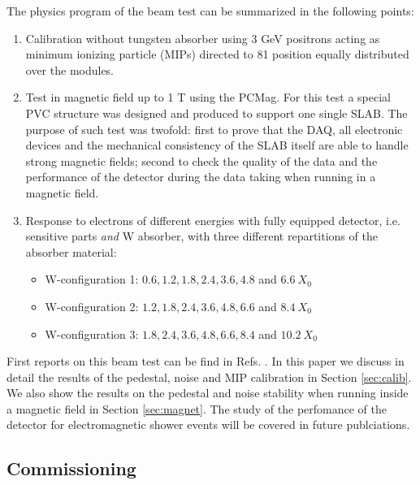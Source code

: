 \documentclass[final,3p,times,twocolumn]{elsarticle}
\begin{document}
The physics program of the beam test can be summarized in the following points:

\begin{enumerate}
\item Calibration without tungsten absorber using 3 GeV positrons acting as minimum ionizing particle (MIPs) directed to 81 position equally distributed over the modules.
\item Test in magnetic field up to 1 T using the PCMag. For this test a special PVC structure was
designed and produced to support one single SLAB.	
The purpose of such test was twofold: first to prove that the DAQ, all electronic devices and the 
mechanical consistency of the SLAB itself are able
to handle strong magnetic fields; 
second to check the quality of the data and the performance of the detector during the data taking when running
in a magnetic field.
\item Response to electrons of different energies with fully equipped detector, i.e. sensitive parts {\it and} W absorber, with three different repartitions of the absorber material:
\begin{itemize}
\item W-configuration 1: $0.6,1.2,1.8,2.4,3.6,4.8$ and $6.6~X_{0}$
\item W-configuration 2: $1.2,1.8,2.4,3.6,4.8,6.6$ and $8.4~X_{0}$
\item W-configuration 3: $1.8,2.4,3.6,4.8,6.6,8.4$ and $10.2~X_{0}$
\end{itemize}
\end{enumerate}

First reports on this beam test can be find in
Refs. \cite{Irles:2018uum,Irles:2018hcd}. In this paper we discuss in detail
the results of the pedestal, noise and MIP calibration in Section \ref{sec:calib}.
We also show the results on the pedestal and noise stability when running inside
a magnetic field in Section \ref{sec:magnet}. The study of the perfomance of the detector
for electromagnetic shower events will be covered in future publciations.

\subsection{Commissioning}
\label{sec:commissioning}
\end{document}
